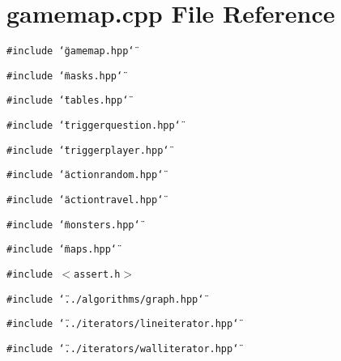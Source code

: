\section{gamemap.cpp File Reference}
\label{gamemap_8cpp}
{\tt \#include \char`\"{}gamemap.hpp\char`\"{}}\par
{\tt \#include \char`\"{}masks.hpp\char`\"{}}\par
{\tt \#include \char`\"{}tables.hpp\char`\"{}}\par
{\tt \#include \char`\"{}triggerquestion.hpp\char`\"{}}\par
{\tt \#include \char`\"{}triggerplayer.hpp\char`\"{}}\par
{\tt \#include \char`\"{}actionrandom.hpp\char`\"{}}\par
{\tt \#include \char`\"{}actiontravel.hpp\char`\"{}}\par
{\tt \#include \char`\"{}monsters.hpp\char`\"{}}\par
{\tt \#include \char`\"{}maps.hpp\char`\"{}}\par
{\tt \#include $<$assert.h$>$}\par
{\tt \#include \char`\"{}../algorithms/graph.hpp\char`\"{}}\par
{\tt \#include \char`\"{}../iterators/lineiterator.hpp\char`\"{}}\par
{\tt \#include \char`\"{}../iterators/walliterator.hpp\char`\"{}}\par
